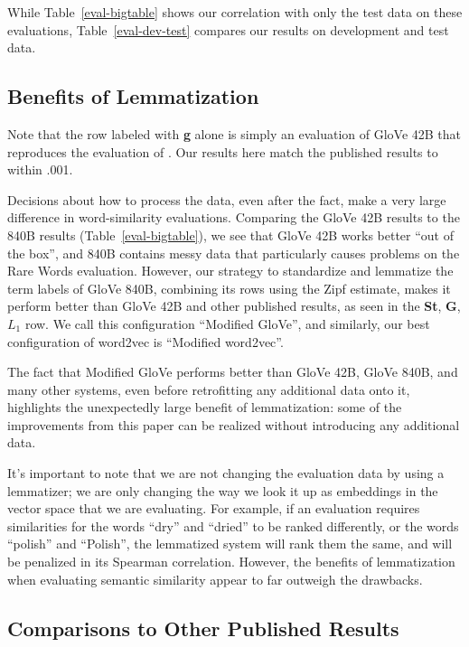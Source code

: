 \documentclass[11pt,letterpaper]{article}
\begin{document}
While Table~\ref{eval-bigtable} shows our correlation with only the test data on
these evaluations, Table~\ref{eval-dev-test} compares our results on
development and test data.

\subsection{Benefits of Lemmatization}

Note that the row labeled with {\bf g} alone is simply an evaluation of GloVe
42B that reproduces the evaluation of . Our results
here match the published results to within .001.

Decisions about how to process the data, even after
the fact, make a very large difference in word-similarity evaluations.
Comparing the GloVe 42B results to the 840B results (Table~\ref{eval-bigtable}), we see that GloVe 42B
works better ``out of the box'', and 840B contains messy data that particularly
causes problems on the Rare Words evaluation. However, our strategy to
standardize and lemmatize the term labels of GloVe 840B, combining its rows using
the Zipf estimate, makes it perform better than GloVe 42B and other published
results, as seen in the {\bf St}, {\bf G}, $L_1$ row. We call this
configuration ``Modified GloVe'',
and similarly, our best configuration of word2vec is ``Modified word2vec''.

The fact that Modified GloVe performs better than GloVe 42B, GloVe 840B, and many
other systems, even before retrofitting any additional data onto it, highlights
the unexpectedly large benefit of lemmatization: some of the improvements from
this paper can be realized without introducing any additional data.

It's important to note that we are not changing the evaluation data by using
a lemmatizer; we are only changing the way we look it up as embeddings in the
vector space that we are evaluating.
For example, if an evaluation requires
similarities for the words ``dry'' and ``dried'' to be ranked differently, or
the words ``polish'' and ``Polish'', the lemmatized system will rank them the
same, and will be penalized in its Spearman correlation.
However, the benefits of lemmatization when evaluating semantic similarity
appear to far outweigh the drawbacks.

\subsection{Comparisons to Other Published Results}
\end{document}
